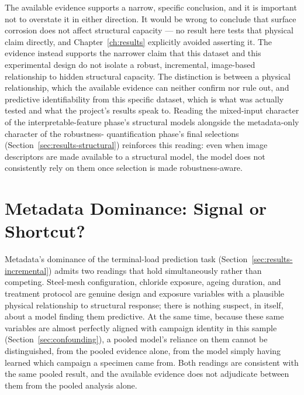 The available evidence supports a narrow, specific conclusion, and it is
important not to overstate it in either direction. It would be wrong to
conclude that surface corrosion does not affect structural capacity — no
result here tests that physical claim directly, and Chapter~\ref{ch:results}
explicitly avoided asserting it. The evidence instead supports the
narrower claim that this dataset and this experimental design do not
isolate a robust, incremental, image-based relationship to hidden
structural capacity. The distinction is between a physical relationship,
which the available evidence can neither confirm nor rule out, and
predictive identifiability from this specific dataset, which is what was
actually tested and what the project's results speak to. Reading the
mixed-input character of the interpretable-feature phase's structural
models alongside the metadata-only character of the robustness-
quantification phase's final selections (Section~\ref{sec:results-structural})
reinforces this reading: even when image descriptors are made available to
a structural model, the model does not consistently rely on them once
selection is made robustness-aware.

\section{Metadata Dominance: Signal or Shortcut?}
\label{sec:interp-metadata}

Metadata's dominance of the terminal-load prediction task
(Section~\ref{sec:results-incremental}) admits two readings that hold
simultaneously rather than competing. Steel-mesh configuration, chloride
exposure, ageing duration, and treatment protocol are genuine design and
exposure variables with a plausible physical relationship to structural
response; there is nothing suspect, in itself, about a model finding them
predictive. At the same time, because these same variables are almost
perfectly aligned with campaign identity in this sample
(Section~\ref{sec:confounding}), a pooled model's reliance on them cannot
be distinguished, from the pooled evidence alone, from the model simply
having learned which campaign a specimen came from. Both readings are
consistent with the same pooled result, and the available evidence does
not adjudicate between them from the pooled analysis alone.

